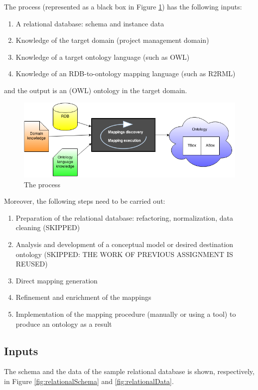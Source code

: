 \documentclass[11pt]{llncs}
\begin{document}
The process (represented as a black box in Figure \ref{fig:blackbox}) has the following inputs:
\begin{enumerate}
 \item A relational database: schema and instance data
 \item Knowledge of the target domain (project management domain)
 \item Knowledge of a target ontology language (such as OWL)
 \item Knowledge of an RDB-to-ontology mapping language (such as R2RML)
\end{enumerate}
and the output is an (OWL) ontology in the target domain.

 \begin{figure}[H]
 \centering
 \includegraphics[scale = 0.55]{img/blackbox.png}
 \caption{The process}
 \label{fig:blackbox}
\end{figure} 

Moreover, the following steps need to be carried out:
\begin{enumerate}
 \item Preparation of the relational database: refactoring, normalization, data cleaning (SKIPPED)
 \item Analysis and development of a conceptual model or desired destination ontology (SKIPPED: THE WORK OF PREVIOUS ASSIGNMENT IS REUSED)
 \item Direct mapping generation 
 \item Refinement and enrichment of the mappings
 \item Implementation of the mapping procedure (manually or using a tool) to produce an ontology as a result
\end{enumerate}

\subsection{Inputs}
The schema and the data of the sample relational database is shown, respectively, in Figure \ref{fig:relationalSchema} and
 \ref{fig:relationalData}.
\end{document}

